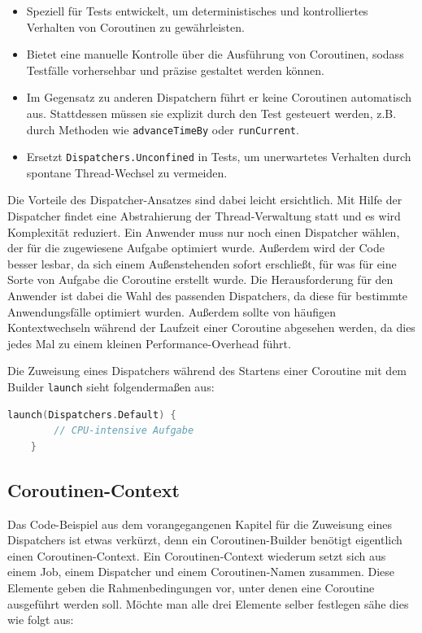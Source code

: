 \documentclass[fontsize=12pt,paper=a4,twoside=semi,parskip=half-,headsepline,headinclude]{scrreprt}
\begin{document}
\begin{itemize}
	\item Speziell für Tests entwickelt, um deterministisches und kontrolliertes Verhalten von Coroutinen zu gewährleisten.
	\item Bietet eine manuelle Kontrolle über die Ausführung von Coroutinen, sodass Testfälle vorhersehbar und präzise gestaltet werden können.
	\item Im Gegensatz zu anderen Dispatchern führt er keine Coroutinen automatisch aus. Stattdessen müssen sie explizit durch den Test gesteuert werden, z.B. durch Methoden wie \texttt{advanceTimeBy} oder \texttt{runCurrent}.
	\item Ersetzt \texttt{Dispatchers.Unconfined} in Tests, um unerwartetes Verhalten durch spontane Thread-Wechsel zu vermeiden.
\end{itemize}

Die Vorteile des Dispatcher-Ansatzes sind dabei leicht ersichtlich. Mit Hilfe der Dispatcher findet eine Abstrahierung der Thread-Verwaltung statt und es wird Komplexität reduziert. Ein Anwender muss nur noch einen Dispatcher wählen, der für die zugewiesene Aufgabe optimiert wurde. Außerdem wird der Code besser lesbar, da sich einem Außenstehenden sofort erschließt, für was für eine Sorte von Aufgabe die Coroutine erstellt wurde. Die Herausforderung für den Anwender ist dabei die Wahl des passenden Dispatchers, da diese für bestimmte Anwendungsfälle optimiert wurden. Außerdem sollte von häufigen Kontextwechseln während der Laufzeit einer Coroutine abgesehen werden, da dies jedes Mal zu einem kleinen  Performance-Overhead führt.

Die Zuweisung eines Dispatchers während des Startens einer Coroutine mit dem Builder \texttt{launch} sieht folgendermaßen aus:

\begin{lstlisting}[language=Kotlin]
	launch(Dispatchers.Default) {
		// CPU-intensive Aufgabe
	}
\end{lstlisting}

\subsection{Coroutinen-Context}
\label{subsec:coroutinecontext}

Das Code-Beispiel aus dem vorangegangenen Kapitel für die Zuweisung eines Dispatchers ist etwas verkürzt, denn ein Coroutinen-Builder benötigt eigentlich einen Coroutinen-Context. Ein Coroutinen-Context wiederum setzt sich aus einem Job, einem Dispatcher und einem Coroutinen-Namen zusammen. Diese Elemente geben die Rahmenbedingungen vor, unter denen eine Coroutine ausgeführt werden soll. Möchte man alle drei Elemente selber festlegen sähe dies wie folgt aus:
\end{document}
